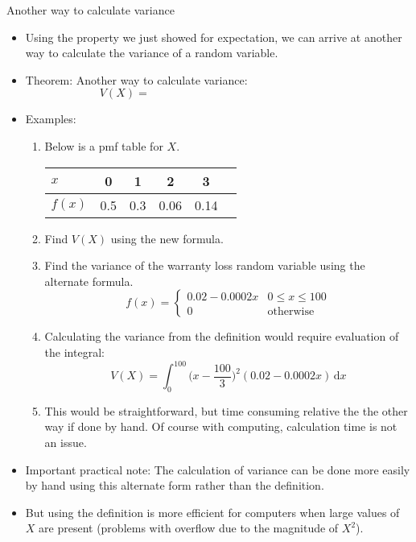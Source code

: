 \documentclass{article}
\newcommand{\integral}[4]{\displaystyle \int_{#1}^{#2} #3 \,\mathrm{d} #4}		%
\begin{document}
Another way to calculate variance\bigskip
\begin{itemize}
    \item Using the property we just showed for expectation, we can arrive at another way to calculate the variance of a random variable.\vspace{140pt}
    \item Theorem: Another way to calculate variance:
    \[V(X) = \hspace{200pt}\]\vspace{30pt}
    \item Examples:
    \begin{enumerate}
        \item Below is a pmf table for $X$.\bigskip\\
        \begin{tabular}{| l || c | c | c | c | c |}
            \hline
            $x$ & 0 & 1 & 2 & 3\\
            \hline
            $f(x)$ & 0.5 & 0.3 & 0.06 & 0.14\\
            \hline
        \end{tabular}\bigskip
        \item[] Find $V(X)$ using the new formula.\vspace{70pt}
        \item Find the variance of the warranty loss random variable using the alternate formula.    
        \[
        f(x) =
            \left\{
            \begin{array}{ll}
                 0.02 - 0.0002x & 0 \le x \le 100\\
                 0 & \text{otherwise}
            \end{array}
            \right.
        \]\vspace{80pt}
        \item[] Calculating the variance from the definition would require evaluation of the integral:
        \[V(X) = \integral{0}{100}{\Big(x - \frac{100}{3}\Big)^2 (0.02 - 0.0002x)}{x}\]
        \item[] This would be straightforward, but time consuming relative the the other way if done by hand. Of course with computing, calculation time is not an issue.
    \end{enumerate}
    \item Important practical note: The calculation of variance can be done more easily by hand using this alternate form rather than the definition.
    \item[] But using the definition is more efficient for computers when large values of $X$ are present (problems with overflow due to the magnitude of $X^2$).
\end{itemize}\bigskip
\end{document}
